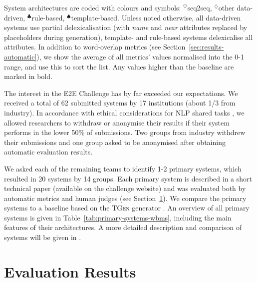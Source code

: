 \documentclass[11pt,a4paper]{article}
\newcommand\tgen{\textsc{TGen}\xspace}
\newcommand{\symbseq}{$^\heartsuit$}
\newcommand{\symbdd}{$^\diamondsuit$}
\newcommand{\symbrule}{$^\clubsuit$}
\newcommand{\symbtempl}{$^\spadesuit$}
\begin{document}
\begin{table*}[t]
\medskip\small
System architectures are coded with colours and symbols: \textcolor{seqtoseq}{\symbseq seq2seq}, \textcolor{datadriven}{\symbdd other data-driven}, \textcolor{rules}{\symbrule rule-based}, \textcolor{templates}{\symbtempl template-based}.
Unless noted otherwise, all data-driven systems use partial delexicalisation (with \emph{name} and \emph{near} attributes replaced by placeholders during generation), template- and rule-based systems delexicalise all attributes.
In addition to word-overlap metrics (see Section~\ref{sec:results-automatic}), we show the average of all metrics' values normalised into the 0-1 range, and use this to sort the list. Any values higher than the baseline are marked in bold.
\end{table*}

The interest in the E2E Challenge has by far exceeded our expectations. We received a total of 62 submitted systems by 17 institutions (about 1/3 from industry).
In accordance with ethical considerations for NLP shared tasks \cite{ethicalSharedTasks}, we allowed researchers to withdraw or anonymise their results if their system performs in the lower 50\% of submissions.
Two groups from industry withdrew their submissions and one group asked to be anonymised
after obtaining automatic evaluation results. 


We asked each of the remaining teams to identify 1-2 primary systems, which resulted in 20 systems by 14 groups. 
Each primary system is described in a short technical paper (available on the challenge website) and was
evaluated both by automatic metrics and human judges (see Section~\ref{sec:results}).
We compare the primary systems to a baseline based on the \tgen generator \cite{Dusek:ACL16}.
An overview of all primary systems is given in Table~\ref{tab:primary-systems-wbms}, including the main features of their architectures.
A more detailed description and comparison of systems will be given in \cite{dusek2018e2e}.


\section{Evaluation Results}\label{sec:results}
\end{document}
